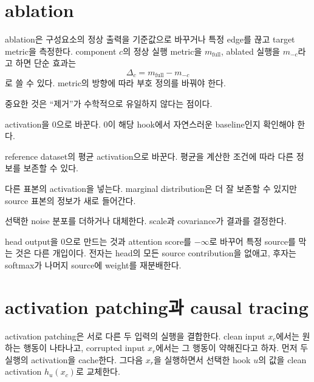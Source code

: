 \section{ablation}

ablation은 구성요소의 정상 출력을 기준값으로 바꾸거나 특정 edge를 끊고 target metric을 측정한다.
component $c$의 정상 실행 metric을 $m_{\mathrm{full}}$, ablated 실행을 $m_{-c}$라고 하면 단순 효과는
\begin{equation}
  \Delta_c=m_{\mathrm{full}}-m_{-c}
\end{equation}
로 쓸 수 있다.
metric의 방향에 따라 부호 정의를 바꿔야 한다.

중요한 것은 ``제거''가 수학적으로 유일하지 않다는 점이다.

\begin{description}[style=nextline,leftmargin=2em]
  \item[zero ablation]
  activation을 0으로 바꾼다.
  0이 해당 hook에서 자연스러운 baseline인지 확인해야 한다.

  \item[mean ablation]
  reference dataset의 평균 activation으로 바꾼다.
  평균을 계산한 조건에 따라 다른 정보를 보존할 수 있다.

  \item[resample ablation]
  다른 표본의 activation을 넣는다.
  marginal distribution은 더 잘 보존할 수 있지만 source 표본의 정보가 새로 들어간다.

  \item[noise ablation]
  선택한 noise 분포를 더하거나 대체한다.
  scale과 covariance가 결과를 결정한다.
\end{description}

head output을 0으로 만드는 것과 attention score를 $-\infty$로 바꾸어 특정 source를 막는 것은 다른 개입이다.
전자는 head의 모든 source contribution을 없애고, 후자는 softmax가 나머지 source에 weight를 재분배한다.

\section{activation patching과 causal tracing}

activation patching은 서로 다른 두 입력의 실행을 결합한다.
clean input $x_c$에서는 원하는 행동이 나타나고, corrupted input $x_r$에서는 그 행동이 약해진다고 하자.
먼저 두 실행의 activation을 cache한다.
그다음 $x_r$을 실행하면서 선택한 hook $u$의 값을 clean activation $h_u(x_c)$로 교체한다.

